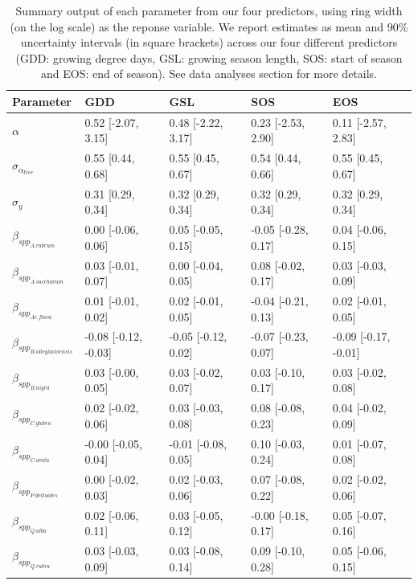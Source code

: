 \documentclass{article}\usepackage[]{graphicx}\usepackage[]{xcolor}
\begin{document}
\begin{table}[ht]
\centering
\caption{Summary output of each parameter from our four predictors, using ring width (on the log scale) as the reponse variable. We report estimates as mean and 90\% uncertainty intervals (in square brackets) across our four different predictors (GDD: growing degree days, GSL: growing season length, SOS: start of season and EOS: end of season). See data analyses section for more details.} 
\label{tab:tab_all}
\begin{tabular}{lllll}
  \hline
Parameter & GDD & GSL & SOS & EOS \\ 
  \hline
$\alpha$ & 0.52 [-2.07, 3.15] & 0.48 [-2.22, 3.17] & 0.23 [-2.53, 2.90] & 0.11 [-2.57, 2.83] \\ 
  $\sigma_{\alpha_{tree}}$ & 0.55 [0.44, 0.68] & 0.55 [0.45, 0.67] & 0.54 [0.44, 0.66] & 0.55 [0.45, 0.67] \\ 
  $\sigma_{y}$ & 0.31 [0.29, 0.34] & 0.32 [0.29, 0.34] & 0.32 [0.29, 0.34] & 0.32 [0.29, 0.34] \\ 
  $\beta_{spp_{A. rubrum}}$ & 0.00 [-0.06, 0.06] & 0.05 [-0.05, 0.15] & -0.05 [-0.28, 0.17] & 0.04 [-0.06, 0.15] \\ 
  $\beta_{spp_{A. saccharum}}$ & 0.03 [-0.01, 0.07] & 0.00 [-0.04, 0.05] & 0.08 [-0.02, 0.17] & 0.03 [-0.03, 0.09] \\ 
  $\beta_{spp_{Ae. flava}}$ & 0.01 [-0.01, 0.02] & 0.02 [-0.01, 0.05] & -0.04 [-0.21, 0.13] & 0.02 [-0.01, 0.05] \\ 
  $\beta_{spp_{B. alleghaniensis}}$ & -0.08 [-0.12, -0.03] & -0.05 [-0.12, 0.02] & -0.07 [-0.23, 0.07] & -0.09 [-0.17, -0.01] \\ 
  $\beta_{spp_{B. nigra}}$ & 0.03 [-0.00, 0.05] & 0.03 [-0.02, 0.07] & 0.03 [-0.10, 0.17] & 0.03 [-0.02, 0.08] \\ 
  $\beta_{spp_{C. glabra}}$ & 0.02 [-0.02, 0.06] & 0.03 [-0.03, 0.08] & 0.08 [-0.08, 0.23] & 0.04 [-0.02, 0.09] \\ 
  $\beta_{spp_{C. ovata}}$ & -0.00 [-0.05, 0.04] & -0.01 [-0.08, 0.05] & 0.10 [-0.03, 0.24] & 0.01 [-0.07, 0.08] \\ 
  $\beta_{spp_{P. deltoides}}$ & 0.00 [-0.02, 0.03] & 0.02 [-0.03, 0.06] & 0.07 [-0.08, 0.22] & 0.02 [-0.02, 0.06] \\ 
  $\beta_{spp_{Q. alba}}$ & 0.02 [-0.06, 0.11] & 0.03 [-0.05, 0.12] & -0.00 [-0.18, 0.17] & 0.05 [-0.07, 0.16] \\ 
  $\beta_{spp_{Q. rubra}}$ & 0.03 [-0.03, 0.09] & 0.03 [-0.08, 0.14] & 0.09 [-0.10, 0.28] & 0.05 [-0.06, 0.15] \\ 

\end{tabular}
\end{table}
\end{document}
